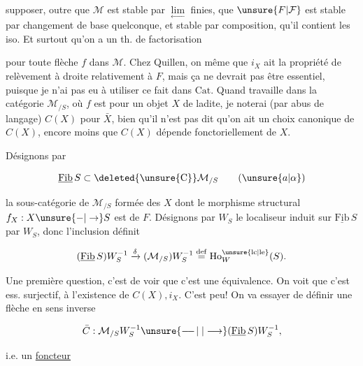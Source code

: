 supposer, outre que $\mathcal M$ est stable par $\underset{\leftarrow}{\lim}$ finies, que $\unsure{F|\mathcal F}$ est stable par changement de base quelconque, et stable par composition, qu'il contient les iso. Et surtout qu'on a un th. de factorisation


pour toute flèche $f$ dans $\mathcal M$. Chez Quillen, on  même que $i_X$ ait la propriété de relèvement à droite  relativement à $F$, mais ça ne devrait pas être essentiel, puisque je n'ai pas eu à utiliser ce fait dans $\mathrm{Cat}$. Quand  travaille dans la catégorie $\mathcal M_{/S}$, où $f$ est  pour un objet $X$ de ladite, je noterai (par abus de langage) $C(X)$ pour $\bar X$, bien qu'il n'est pas dit qu'on ait un choix canonique de $C(X)$, encore moins que $C(X)$ dépende fonctoriellement de $X$.

Désignons par

\[
\underline{\mathrm{Fib}}\,S\subset\deleted{\unsure{\mathrm{C}}}\mathcal M_{/S}\tag*{(\ensuremath{\unsure{a|\alpha}})}
\]

la sous-catégorie de $\mathcal M_{/S}$ formée des $X$ dont le morphisme structural $f_X:X\unsure{-|\to}S$ est de $F$.  Désignons  par $W_S$ le localiseur induit sur $\underline{\mathrm{Fib}}\,S$ par $W_S$, donc l'inclusion  définit

\[
(\underline{\mathrm{Fib}}\,S)W_S^{-1}\xrightarrow{\delta}(\mathcal M_{/S})W_S^{-1}\overset{\mathrm{def}}{=}\mathrm{Ho}^{\unsure{\mathrm{lc}|\mathrm{le}}}_W(S).
\]

Une première question, c'est de voir que c'est une équivalence. On voit que c'est ess. surjectif,  à l'existence de $C(X),i_X$. C'est peu! On va essayer de définir une flèche en sens inverse

\[
\bar C:\mathcal M_{/S}W_S^{-1}\unsure{\mathrel{\relbar\joinrel\relbar\joinrel\vert}|\longrightarrow}(\underline{\mathrm{Fib}}\,S)W_S^{-1},
\]

i.e. un \uline{foncteur}

